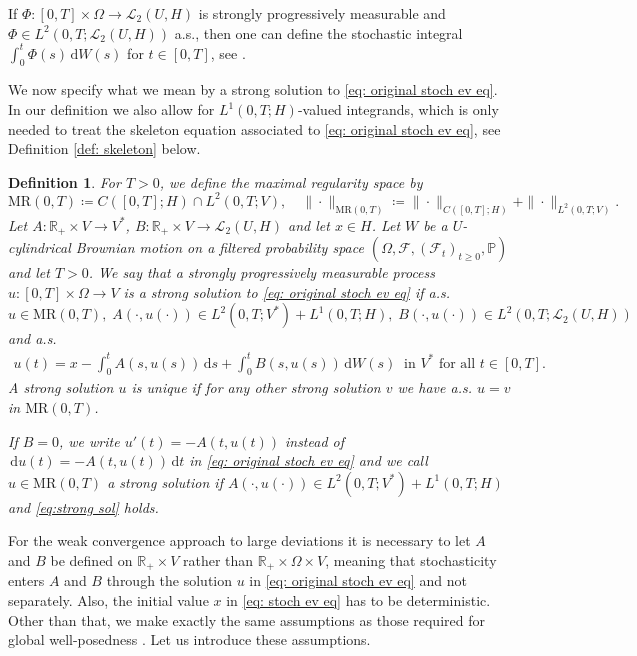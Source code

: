 \documentclass{amsart}
\newcommand{\dd}{\,\mathrm{d}}
\renewcommand{\MR}{\mathrm{MR}}
\newcommand{\UH}{\mathcal{L}_2(U,H)}
\newcommand{\<}{\langle}
\newcommand{\?}{\rangle}
\theoremstyle{plain}
\theoremstyle{remark}
\theoremstyle{plain}
\newtheorem{definition}[theorem]{Definition}
\numberwithin{equation}{section}
\def\R{{\mathbb R}}
\renewcommand{\P}{\mathbb{P}}
\newcommand{\Om}{\Omega}
\begin{document}
If $\Phi:[0,T]\times \Om\to \UH$ is strongly progressively measurable and $\Phi\in L^2(0,T;\UH)$ a.s., then one can define the stochastic integral $\int_0^t \Phi(s)\dd W(s)$ for $t\in[0,T]$, see \cite[\S 5.4 $(p=0)$]{NVW15}.

We now specify what we mean by a strong solution to \eqref{eq: original stoch ev eq}. In our definition we also  allow for $L^1(0,T;H)$-valued integrands, which is only needed to treat the skeleton equation associated to \eqref{eq: original stoch ev eq}, see Definition \ref{def: skeleton} below.

\begin{definition}\label{def:strong sol}
For $T>0$, we define the \emph{maximal regularity space} by
\[
\MR(0,T)\coloneqq C([0,T];H)\cap L^2(0,T;V), \quad \|\cdot\|_{\MR(0,T)}\coloneqq \|\cdot\|_{C([0,T];H)}+\|\cdot\|_{L^2(0,T;V)}.
\]
Let $A\colon\R_+\times V\to V^*$, $B\colon\R_+\times V\to \UH$ and let $x\in H$. Let $W$ be a $U$-cylindrical Brownian motion on a filtered probability space $(\Om,\mathcal{F},(\mathcal{F}_t)_{t\geq 0},\P)$ and let $T>0$. We say that a strongly progressively measurable process $u\colon [0,T]\times \Om\to V$ is a \emph{strong solution} to \eqref{eq: original stoch ev eq} if a.s.
\[
u\in\MR(0,T),\; A(\cdot,u(\cdot))\in L^2(0,T;V^*)+L^1(0,T;H),\; B(\cdot,u(\cdot))\in L^2(0,T;\UH)
\]
and a.s.
\begin{align}\label{eq:strong sol}
  u(t)=x-\int_0^t A(s,u(s))\dd s+\int_0^t B(s,u(s))\dd W(s) \: \text{ in }V^* \text{ for all }t\in[0,T].
\end{align}
A strong solution $u$ is \emph{unique} if for any other strong solution $v$ we  have a.s. $u=v$ in $\MR(0,T)$.

If $B=0$, we write $u'(t)=-A(t,u(t))$ instead of $\dd u(t)=-A(t,u(t))\dd t$ in \eqref{eq: original stoch ev eq} and we call $u\in \MR(0,T)$ a strong solution  if $A(\cdot,u(\cdot))\in L^2(0,T;V^*)+L^1(0,T;H)$ and \eqref{eq:strong sol} holds.
\end{definition}

For the weak convergence approach to large deviations it is necessary to let $A$ and $B$ be defined on $\R_+\times V$ rather than $\R_+\times\Om\times V$, meaning that stochasticity enters $A$ and $B$  through the solution $u$ in \eqref{eq: original stoch ev eq} and not separately. Also, the initial value $x$ in \eqref{eq: stoch ev eq} has to be deterministic. Other than that, we make exactly the same assumptions as those required for global well-posedness \cite[Th. 3.5]{AV22variational}. Let us introduce these assumptions.
\end{document}
